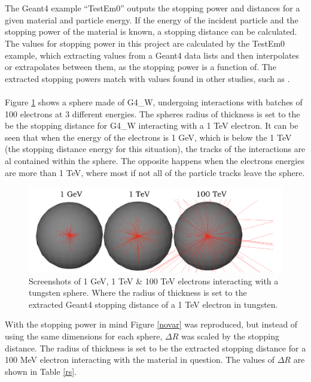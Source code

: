 \documentclass[12pt,a4paper]{article}
\begin{document}
\\\\
\noindent The Geant4 example ``TestEm0'' outputs the stopping power and distances for a given material and particle energy. If the energy of the incident particle and the stopping power of the material is known, a stopping distance can be calculated. The values for stopping power in this project are calculated by the TestEm0 example, which extracting values from a Geant4 data lists and then interpolates or extrapolates between them, as the stopping power is a function of. The extracted stopping powers match with values found in other studies, such as \cite{stpdat}.
\\\\
Figure \ref{tung} shows a sphere made of G4\_W, undergoing interactions with batches of 100 electrons at 3 different energies. The spheres radius of thickness is set to the be the stopping distance for G4\_W interacting with a 1 TeV electron. It can be seen that when the energy of the electrons is 1 GeV, which is below the 1 TeV (the stopping distance energy for this situation), the tracks of the interactions are al contained within the sphere. The opposite happens when the electrons energies are more than 1 TeV, where most if not all of the particle tracks leave the sphere. 

\begin{figure}[h!]
\hspace*{1.4cm}\includegraphics[scale=0.5]{Images//BDSIM//Tungsten_Sphere.png}
\caption[width=\columnwidth]{Screenshots of 1 GeV, 1 TeV \& 100 TeV electrons interacting with a tungsten sphere. Where the radius of thickness is set to the extracted Geant4 stopping distance of a 1 TeV electron in tungsten.}
\label{tung}
\end{figure}

\noindent With the stopping power in mind Figure \ref{novar} was reproduced, but instead of using the same dimensions for each sphere, $\Delta R$ was scaled by the stopping distance. The radius of thickness is set to be the extracted stopping distance for a 100 MeV electron interacting with the material in question. The values of $\Delta R$ are shown in Table \ref{rs}.
\end{document}
